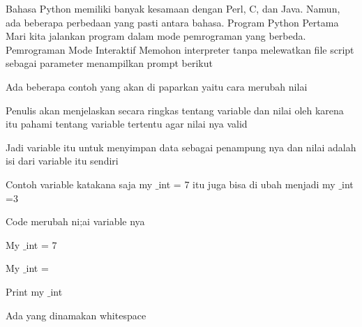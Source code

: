 \vspace{14pt}
\noindent 
{\fontsize{14pt}{14pt}\selectfont \vspace{\baselineskip}
Bahasa Python memiliki banyak kesamaan dengan Perl, C, dan Java. Namun, ada beberapa perbedaan yang pasti antara bahasa. Program Python Pertama Mari kita jalankan program dalam mode pemrograman yang berbeda. Pemrograman Mode Interaktif Memohon interpreter tanpa melewatkan file script sebagai parameter menampilkan prompt berikut  \\} \par
\vspace{14pt}
\noindent 
{\fontsize{14pt}{14pt}\selectfont Ada beberapa contoh yang akan di paparkan yaitu cara merubah nilai \\} \par
\noindent 
{\fontsize{14pt}{14pt}\selectfont Penulis akan menjelaskan secara ringkas tentang variable dan nilai oleh karena itu pahami tentang variable tertentu agar nilai nya valid \\} \par
\vspace{14pt}
\noindent 
{\fontsize{14pt}{14pt}\selectfont Jadi variable itu untuk menyimpan data sebagai penampung nya dan nilai adalah isi dari variable itu sendiri \\} \par
\vspace{14pt}
\noindent 
{\fontsize{14pt}{14pt}\selectfont Contoh variable katakana saja my $  \_  $int = 7 itu juga bisa di ubah menjadi my $  \_  $int =3  \\} \par
\vspace{14pt}
\noindent 
{\fontsize{14pt}{14pt}\selectfont Code merubah ni;ai variable nya  \\} \par
\noindent 
{\fontsize{14pt}{14pt}\selectfont My $  \_  $int = 7 \\} \par
\noindent 
{\fontsize{14pt}{14pt}\selectfont My $  \_  $int = \\} \par
\noindent 
{\fontsize{14pt}{14pt}\selectfont Print my $  \_  $int \\} \par
\vspace{14pt}
\noindent 
{\fontsize{14pt}{14pt}\selectfont Ada yang dinamakan whitespace  \\} \par
\vspace{14pt}
